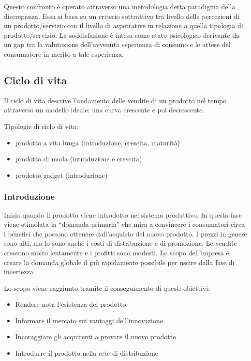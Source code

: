 Questo confronto è operato attraverso una metodologia detta paradigma della discrepanza. Essa si basa su un criterio sottrattivo tra livello delle percezioni di un prodotto/servizio con il livello di aspettative in relazione a quella tipologia di prodotto/servizio. La soddisfazione è intesa come stato psicologico derivante da un gap tra la valutazione dell'avvenuta esperienza di consumo e le attese del consumatore in merito a tale esperienza.

\subsection{Ciclo di vita}
Il ciclo di vita descrive l’andamento delle vendite di un prodotto nel tempo attraverso un modello ideale: una curva crescente e poi decrescente.

Tipologie di ciclo di vita:
\begin{itemize}
	\item prodotto a vita lunga (introduzione, crescita, maturità)
	\item prodotto di moda (introduzione e crescita)
	\item prodotto gadget (introduzione)
\end{itemize}

\subsubsection{Introduzione}
Inizia quando il prodotto viene introdotto nel sistema produttivo. In questa fase viene stimolata la “domanda primaria” che mira a convincere i consumatori circa i benefici che possono ottenere dall’acquisto del nuovo prodotto. I prezzi in genere sono alti, ma lo sono anche i costi di distribuzione e di promozione. Le vendite crescono molto lentamente e i profitti sono modesti.
Lo scopo dell’impresa è creare la domanda globale il più rapidamente possibile per uscire dalla fase di incertezza.
 
Lo scopo viene raggiunto tramite il conseguimento di questi obiettivi:
\begin{itemize}
	\item Rendere nota l’esistenza del prodotto
	\item Informare il mercato sui vantaggi dell’innovazione
	\item Incoraggiare gli acquirenti a provare il nuovo prodotto
	\item Introdurre il prodotto nella rete di distribuzione
\end{itemize}

